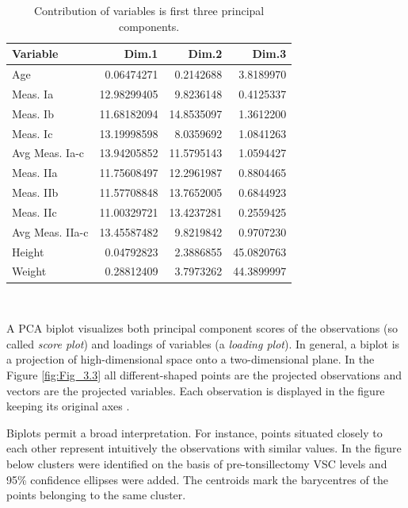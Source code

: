 \documentclass[12pt,a4paper,notitlepage]{report}
\begin{document}
\begin{table}[H]
\centering
	\begin{tabular}{lrrr}
	\hline \textbf{Variable}  & \textbf{Dim.1}	& \textbf{Dim.2} & \textbf{Dim.3}\\
	\hline
	\hline
	Age				&	0.06474271 	 	&	0.2142688  	&	3.8189970\\
	Meas. Ia			&	12.98299405  	&	9.8236148  	&	0.4125337\\
	Meas. Ib			&	11.68182094  	&	14.8535097  	&	1.3612200\\
	Meas. Ic			&	13.19998598  	&	8.0359692  	&	1.0841263\\
	Avg Meas. Ia-c	&	13.94205852  	&	11.5795143  	&	1.0594427\\
	Meas. IIa		&	11.75608497  	&	12.2961987  	&	0.8804465\\
	Meas. IIb		&	11.57708848  	&	13.7652005  	&	0.6844923\\
	Meas. IIc		&	11.00329721  	&	13.4237281  	&	0.2559425\\
	Avg Meas. IIa-c	&	13.45587482  	&	9.8219842  	&	0.9707230\\
	Height			&	0.04792823  		&	2.3886855  	&	45.0820763\\
	Weight			&	0.28812409  		&	3.7973262  	&	44.3899997\\
	\hline
	\end{tabular} \\ 
	\caption{Contribution of variables is first three principal components.}
	\label{tab:Var_coordinates}
\end{table}

\newpage
A PCA biplot visualizes both principal component scores of the observations (so called \textit{score plot}) and loadings of variables (a \textit{loading plot}). In general, a biplot is a projection of high-dimensional space onto a two-dimensional plane. In the Figure \ref{fig:Fig_3.3} all different-shaped points are the projected observations and vectors are the projected variables. Each observation is displayed in the figure keeping its original axes \cite{Zhang17}. 

Biplots permit a broad interpretation. For instance, points situated closely to each other represent intuitively the observations with similar values. In the figure below clusters were identified on the basis of pre-tonsillectomy VSC levels and 95\% confidence ellipses were added. The centroids mark the barycentres of the points belonging to the same cluster.
\end{document}
